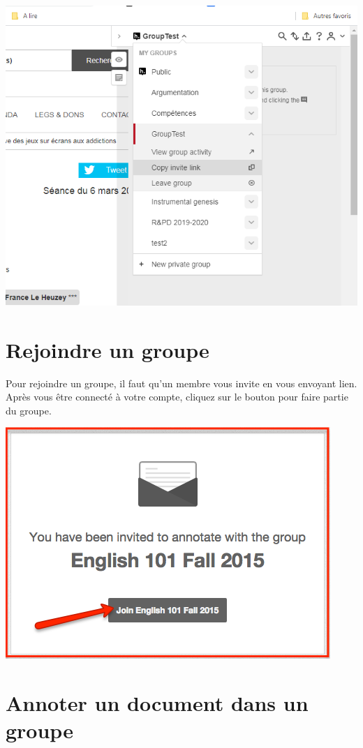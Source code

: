 \documentclass[
]{book}
\begin{document}
\includegraphics{img/10545b5bdaaf92692913d7f2ab400691.png}

\hypertarget{s63}{%
\section{Rejoindre un groupe}\label{s63}}

Pour rejoindre un groupe, il faut qu'un membre vous invite en vous envoyant lien. Après vous être connecté à votre compte, cliquez sur le bouton pour faire partie du groupe.

\includegraphics{img/3c43f5853bd5bc770efb60d74686f1ae.png}

\hypertarget{s64}{%
\section{Annoter un document dans un groupe}\label{s64}}
\end{document}
